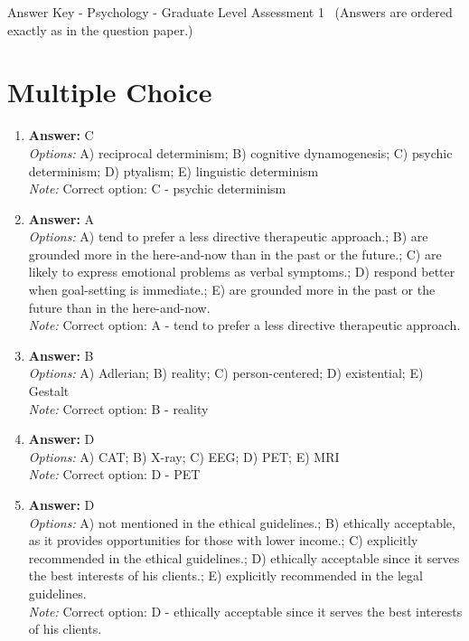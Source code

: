\documentclass[12pt]{article}
\begin{document}
\begin{center}
Answer Key - Psychology - Graduate Level Assessment 1 \
\small (Answers are ordered exactly as in the question paper.)
\end{center}

\section*{Multiple Choice}
\begin{enumerate}[label=\arabic*.]
\item \textbf{Answer:} C
\\ \textit{Options:} A) reciprocal determinism; B) cognitive dynamogenesis; C) psychic determinism; D) ptyalism; E) linguistic determinism
\\ \textit{Note:} Correct option: C - psychic determinism
\item \textbf{Answer:} A
\\ \textit{Options:} A) tend to prefer a less directive therapeutic approach.; B) are grounded more in the here-and-now than in the past or the future.; C) are likely to express emotional problems as verbal symptoms.; D) respond better when goal-setting is immediate.; E) are grounded more in the past or the future than in the here-and-now.
\\ \textit{Note:} Correct option: A - tend to prefer a less directive therapeutic approach.
\item \textbf{Answer:} B
\\ \textit{Options:} A) Adlerian; B) reality; C) person-centered; D) existential; E) Gestalt
\\ \textit{Note:} Correct option: B - reality
\item \textbf{Answer:} D
\\ \textit{Options:} A) CAT; B) X-ray; C) EEG; D) PET; E) MRI
\\ \textit{Note:} Correct option: D - PET
\item \textbf{Answer:} D
\\ \textit{Options:} A) not mentioned in the ethical guidelines.; B) ethically acceptable, as it provides opportunities for those with lower income.; C) explicitly recommended in the ethical guidelines.; D) ethically acceptable since it serves the best interests of his clients.; E) explicitly recommended in the legal guidelines.
\\ \textit{Note:} Correct option: D - ethically acceptable since it serves the best interests of his clients.
\end{enumerate}
\end{document}

